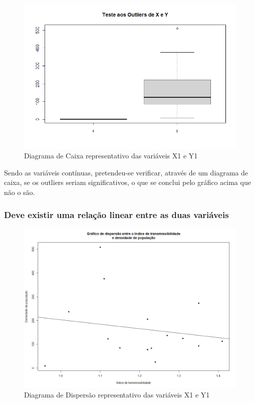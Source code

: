 \documentclass[conference]{IEEEtran}
\begin{document}
\begin{figure}[htbp]
\centerline{\includegraphics[width=0.95\columnwidth]{images/03.a.1.png}}
\caption{Diagrama de Caixa representativo das variáveis X1 e Y1}
\label{fig}
\end{figure}

Sendo as variáveis contínuas, pretendeu-se verificar, através de um diagrama de caixa, se os outliers seriam significativos, o que se conclui pelo gráfico acima que não o são.

\subsubsection{Deve existir uma relação linear entre as duas variáveis}

\begin{figure}[htbp]
\centerline{\includegraphics[width=0.95\columnwidth]{images/03.a.2.png}}
\caption{Diagrama de Dispersão representativo das variáveis X1 e Y1}
\label{fig}
\end{figure}
\end{document}
